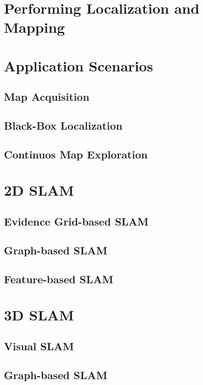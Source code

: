 \section{Performing Localization and Mapping}


\section{Application Scenarios}

\subsection{Map Acquisition}

\subsection{Black-Box Localization}

\subsection{Continuos Map Exploration}


\section{2D SLAM}

\subsection{Evidence Grid-based SLAM}

\subsection{Graph-based SLAM}

\subsection{Feature-based SLAM}


\section{3D SLAM}

\subsection{Visual SLAM}

\subsection{Graph-based SLAM}


